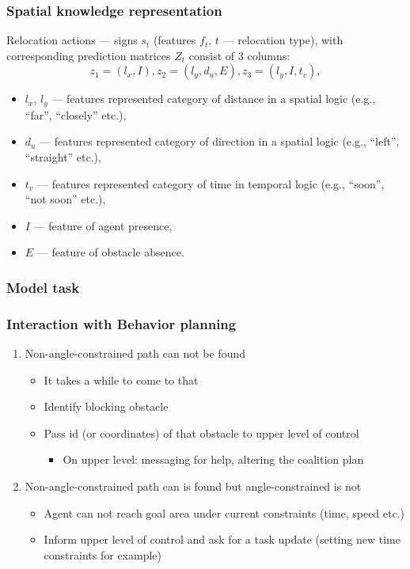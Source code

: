 \documentclass[default]{beamer}
\begin{document}
	\begin{frame}
		\frametitle{Spatial knowledge representation}
		
		Relocation actions --- signs $s_t$ (features $f_t$, $t$ --- relocation type), with corresponding prediction matrices $Z_t$ consist of 3 columns:
		\[
		z_1=(l_x, I), z_2=(l_y, d_u, E), z_3=(l_y, I, t_v),
		\]
		\begin{itemize}
			\item $l_x$, $l_y$ --- features represented category of distance in a spatial logic (e.g., ``far'', ``closely'' etc.), 
			\item $d_u$ --- features represented category of direction in a spatial logic (e.g., ``left'', ``straight'' etc.), 
			\item $t_v$ --- features represented category of time in temporal logic (e.g., ``soon'', ``not soon'' etc.),
			\item $I$ --- feature of agent presence, 
			\item $E$ --- feature of obstacle absence.
		\end{itemize}
	\end{frame}
			
	\begin{frame}
		\frametitle{Model task}
		\begin{center}
		\end{center}
	\end{frame}

	\begin{frame}
		\frametitle{Interaction with Behavior planning}
		
		\begin{enumerate}
			\item Non-angle-constrained path can not be found
			\begin{itemize}
				\item It takes a while to come to that
				\item Identify blocking obstacle
				\item Pass id (or coordinates) of that obstacle to upper level of control
				\begin{itemize}
					\item On upper level: messaging for help, altering the coalition plan
				\end{itemize}
			\end{itemize}
			\item Non-angle-constrained path can is found but angle-constrained is not
			\begin{itemize}
				\item Agent can not reach goal area under current constraints (time, speed etc.)
				\item Inform upper level of control and ask for a task update (setting new time constraints for example)
			\end{itemize}
		\end{enumerate}
	\end{frame}
	
\end{document}
